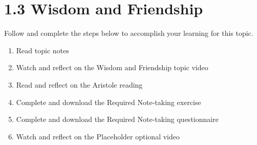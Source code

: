 \documentclass[
]{book}
\providecommand{\tightlist}{%
  \setlength{\itemsep}{0pt}\setlength{\parskip}{0pt}}
\begin{document}
\hypertarget{wisdom-and-friendship}{%
\section*{1.3 Wisdom and Friendship}\label{wisdom-and-friendship}}

Follow and complete the steps below to accomplish your learning for this topic.

\begin{enumerate}
\def\labelenumi{\arabic{enumi}.}
\tightlist
\item
  Read topic notes
\item
  Watch and reflect on the Wisdom and Friendship topic video
\item
  Read and reflect on the Aristole reading
\item
  Complete and download the Required Note-taking exercise
\item
  Complete and download the Required Note-taking questionnaire
\item
  Watch and reflect on the Placeholder optional video
\end{enumerate}
\end{document}
